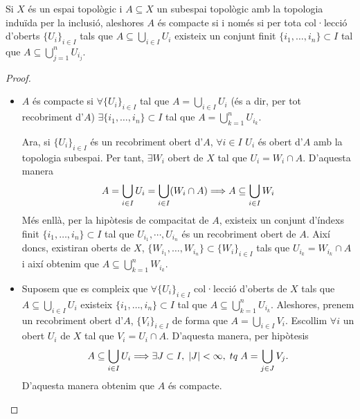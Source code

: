 \documentclass[../main.tex]{subfiles}
\begin{document}
\begin{prop}
\label{prop:subconjuntqc} Si $X$ és un espai topològic i $A\subseteq X$ un subespai topològic amb la topologia induïda per la inclusió, aleshores $A$ és compacte si i només si per tota col·lecció d'oberts $\{U_i\}_{i\in I}$ tals que $A\subseteq\bigcup_{i\in I}U_i$ existeix un conjunt finit $\{i_1,\ldots,i_n\}\subset I$ tal que $A\subseteq \bigcup_{j=1}^n U_{i_j}$.
\end{prop}
\begin{proof}
\begin{itemize}
    \item \fbox{$\Rightarrow$} $A$ és compacte si $\forall\{U_i\}_{i\in I}$ tal que $A = \bigcup_{i\in I}U_i$ (és a dir, per tot recobriment d'$A$) $\exists\{i_1,\ldots,i_n\}\subset I$ tal que $A = \bigcup_{k=1}^n U_{i_k}$. 
    
    Ara, si $\{U_i\}_{i\in I}$ és un recobriment obert d'$A$, $\forall i\in I$ $U_i$ és obert d'$A$ amb la topologia subespai. Per tant, $\exists W_i$ obert de $X$ tal que $U_i = W_i\cap A$. D'aquesta manera
    \begin{equation}
        \notag
        A = \bigcup_{i\in I}U_i = \bigcup_{i\in I}(W_i\cap A)\Longrightarrow A\subseteq \bigcup_{i\in I}W_i
    \end{equation}
    Més enllà, per la hipòtesis de compacitat de $A$, existeix un conjunt d'índexs finit $\{i_1,\ldots,i_n\}\subset I$ tal que $U_{i_1},\cdots,U_{i_n}$ és un recobriment obert de $A$. Així doncs, existiran oberts de $X$, $\{W_{i_1},\ldots,W_{i_n}\}\subset\{W_i\}_{i\in I}$ tals que $U_{i_k} = W_{i_k}\cap A$ i així obtenim que $A\subseteq\bigcup_{k=1}^n W_{i_k}$.
    \item \fbox{$\Leftarrow$} Suposem que es compleix que $\forall\{U_i\}_{i\in I}$ col·lecció d'oberts de $X$ tals que $A\subseteq \bigcup_{i\in I}U_i$ existeix $\{i_1,\ldots,i_n\}\subset I$ tal que $A\subseteq\bigcup_{k=1}^n U_{i_k}$. Aleshores, prenem un recobriment obert d'$A$, $\{V_i\}_{i\in I}$ de forma que $A = \bigcup_{i\in I}V_i$. Escollim $\forall i$ un obert $U_i$ de $X$ tal que $V_i = U_i\cap A$. D'aquesta manera, per hipòtesis
    \begin{equation}
        \notag
        A\subseteq \bigcup_{i\in I}U_i\Longrightarrow \exists J\subset I,\;|J|<\infty,\;tq\;A=\bigcup_{j\in J} V_j.
    \end{equation}
    D'aquesta manera obtenim que $A$ és compacte.
\end{itemize}
\end{proof}
\end{document}
